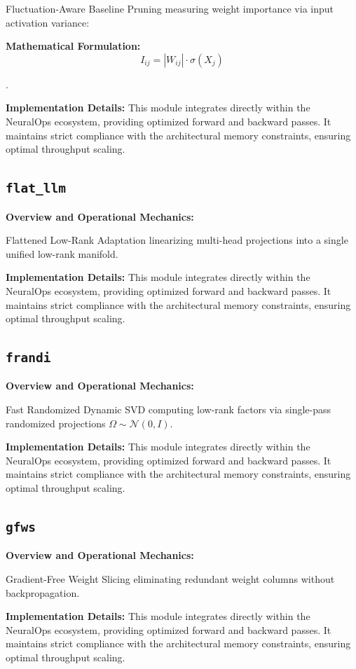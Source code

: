 \documentclass[10pt,twocolumn,letterpaper]{article}
\begin{document}
Fluctuation-Aware Baseline Pruning measuring weight importance via input activation variance:

\textbf{Mathematical Formulation:}
\begin{equation}
I_{ij} = |W_{ij}| \cdot \sigma(X_j)
\end{equation}

.

\textbf{Implementation Details:}
This module integrates directly within the NeuralOps ecosystem, providing optimized forward and backward passes. It maintains strict compliance with the architectural memory constraints, ensuring optimal throughput scaling.

\subsection{\texttt{flat\_llm}}
\textbf{Overview and Operational Mechanics:}

Flattened Low-Rank Adaptation linearizing multi-head projections into a single unified low-rank manifold.

\textbf{Implementation Details:}
This module integrates directly within the NeuralOps ecosystem, providing optimized forward and backward passes. It maintains strict compliance with the architectural memory constraints, ensuring optimal throughput scaling.

\subsection{\texttt{frandi}}
\textbf{Overview and Operational Mechanics:}

Fast Randomized Dynamic SVD computing low-rank factors via single-pass randomized projections $\Omega \sim \mathcal{N}(0, I)$.

\textbf{Implementation Details:}
This module integrates directly within the NeuralOps ecosystem, providing optimized forward and backward passes. It maintains strict compliance with the architectural memory constraints, ensuring optimal throughput scaling.

\subsection{\texttt{gfws}}
\textbf{Overview and Operational Mechanics:}

Gradient-Free Weight Slicing eliminating redundant weight columns without backpropagation.

\textbf{Implementation Details:}
This module integrates directly within the NeuralOps ecosystem, providing optimized forward and backward passes. It maintains strict compliance with the architectural memory constraints, ensuring optimal throughput scaling.
\end{document}
